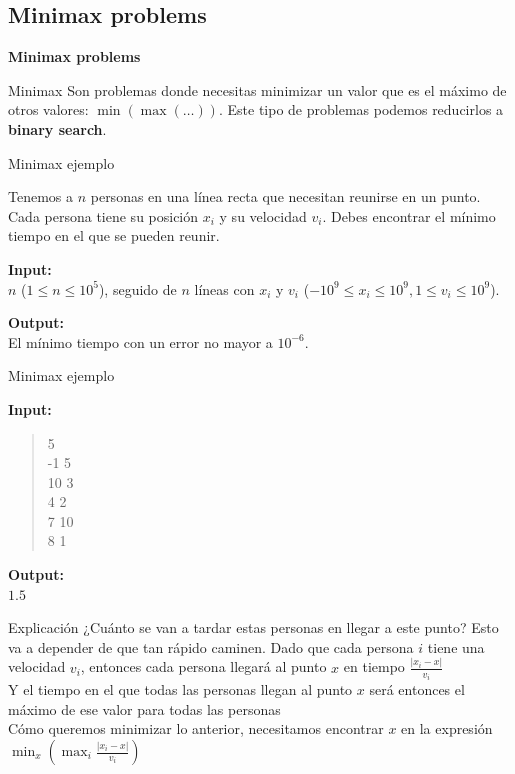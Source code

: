 \subsection{Minimax problems}

\begin{frame}[plain]
	\centering
	\color{theme-brand-color}
	\Huge \textbf{Minimax problems}
\end{frame}

\begin{frame}{Minimax}
	Son problemas donde necesitas minimizar un valor que es el máximo de otros valores: $\min(\max(\dots))$. Este tipo de problemas podemos reducirlos a \textbf{binary search}.
\end{frame}

\begin{frame}{Minimax ejemplo}
	\begin{ExampleP}[title=Get together]
		Tenemos a $n$ personas en una línea recta que necesitan reunirse en un punto. Cada persona tiene su posición $x_{i}$ y su velocidad $v_{i}$. Debes encontrar el mínimo tiempo en el que se pueden reunir.

		\textbf{Input:} \\
		$n$ ($1 \leq n \leq 10^{5}$), seguido de $n$ líneas con $x_{i}$ y $v_{i}$ ($-10^{9} \leq x_{i} \leq 10^{9}, 1 \leq v_{i} \leq 10^{9}$).

		\textbf{Output:} \\
		El mínimo tiempo con un error no mayor a $10^{-6}$.
	\end{ExampleP}
\end{frame}

\begin{frame}{Minimax ejemplo}
	\begin{ExampleP}[title=Get together ejemplo]
		\textbf{Input:} \\
		\begin{quote}
			5    \\
			-1 5 \\
			10 3 \\
			4 2  \\
			7 10 \\
			8 1
		\end{quote}

		\textbf{Output:} \\
		$1.5$
	\end{ExampleP}
\end{frame}

\begin{frame}{Explicación}
	¿Cuánto se van a tardar estas personas en llegar a este punto? Esto va a depender de que tan rápido caminen. Dado que cada persona $i$ tiene una velocidad $v_{i}$, entonces cada persona llegará al punto $x$ en tiempo $\frac{|x_{i} - x|}{v_{i}}$ \\

	Y el tiempo en el que todas las personas llegan al punto $x$ será entonces el máximo de ese valor para todas las personas \\

	Cómo queremos minimizar lo anterior, necesitamos encontrar $x$ en la expresión $\min_{x}(\max_{i} \frac{|x_{i} - x|}{v_{i}})$
\end{frame}

